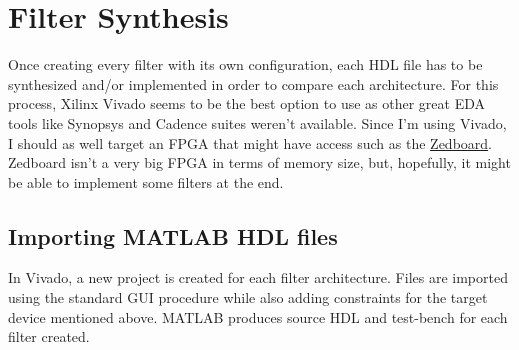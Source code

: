 \section{Filter Synthesis}

Once creating every filter with its own configuration, each HDL file has to be synthesized and/or implemented in order to compare each architecture.
For this process, Xilinx Vivado seems to be the best option to use as other great EDA tools like Synopsys and Cadence suites weren't available. Since I'm using Vivado, I should as well target an FPGA that might have access such as the \href{https://www.xilinx.com/products/boards-and-kits/1-8dyf-11.html}{Zedboard}. Zedboard isn't a very big FPGA in terms of memory size, but, hopefully, it might be able to implement some filters at the end.

\subsection{Importing MATLAB HDL files}
In Vivado, a new project is created for each filter architecture. Files are imported using the standard GUI procedure while also adding constraints for the target device mentioned above.
MATLAB produces source HDL and test-bench for each filter created.